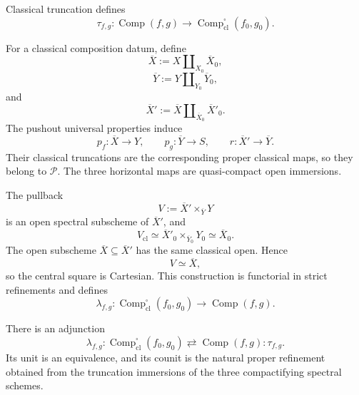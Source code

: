 \begin{construction}
\label{constr:composition-data-lifting}
Classical truncation defines
\[
    \tau_{f,g}:
    \operatorname{Comp}(f,g)
    \longrightarrow
    \operatorname{Comp}^{\square}_{\mathrm{cl}}(f_0,g_0).
\]

For a classical composition datum, define
\[
    \overline X
    :=
    X\amalg_{X_0}\overline X_0,
\]
\[
    \overline Y
    :=
    Y\amalg_{Y_0}\overline Y_0,
\]
and
\[
    \overline X'
    :=
    \overline X
    \amalg_{\overline X_0}
    \overline X'_0.
\]
The pushout universal properties induce
\[
    p_f:\overline X\longrightarrow Y,
    \qquad
    p_g:\overline Y\longrightarrow S,
    \qquad
    r:\overline X'\longrightarrow\overline Y.
\]
Their classical truncations are the corresponding proper classical maps,
so they belong to \(\mathcal P\).  The three horizontal maps are
quasi-compact open immersions.

The pullback
\[
    V
    :=
    \overline X'\times_{\overline Y}Y
\]
is an open spectral subscheme of \(\overline X'\), and
\[
    V_{\mathrm{cl}}
    \simeq
    \overline X'_0
    \times_{\overline Y_0}
    Y_0
    \simeq
    \overline X_0.
\]
The open subscheme \(\overline X\subseteq\overline X'\) has the same
classical open.  Hence
\[
    V\simeq\overline X,
\]
so the central square is Cartesian.  This construction is functorial in
strict refinements and defines
\[
    \lambda_{f,g}:
    \operatorname{Comp}^{\square}_{\mathrm{cl}}(f_0,g_0)
    \longrightarrow
    \operatorname{Comp}(f,g).
\]
\end{construction}

\begin{proposition}
\label{prop:composition-data-lifting-adjunction}
There is an adjunction
\[
    \lambda_{f,g}:
    \operatorname{Comp}^{\square}_{\mathrm{cl}}(f_0,g_0)
    \rightleftarrows
    \operatorname{Comp}(f,g):
    \tau_{f,g}.
\]
Its unit is an equivalence, and its counit is the natural proper refinement
obtained from the truncation immersions of the three compactifying spectral
schemes.
\end{proposition}

